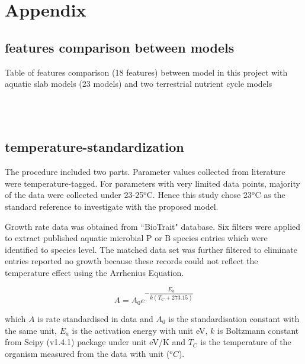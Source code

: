 \documentclass[../thesis.tex]{subfiles} %
\begin{document}
\section{Appendix}
\beginSupp

\subsection{features comparison between models}
\begin{table}[H]
\begin{tiny}
    \centering
    \caption[Model features comparison]{Table of features comparison (18 features) between model in this project with aquatic slab models (23 models) and two terrestrial nutrient cycle models}
    \\
    \vspace{.5cm}
    \\
    \vspace{.5cm}
    \label{modComp}
\end{tiny}
\end{table}

\subsection{temperature-standardization}
The procedure included two parts.  Parameter values collected from literature were temperature-tagged.  For parameters with very limited data points, majority of the data were collected under 23-25$^o$C.  Hence this study chose 23$^o$C as the standard reference to investigate with the proposed model.

Growth rate data was obtained from ``BioTrait" database\autocite{della2013thermal}.  Six filters were applied to extract published aquatic microbial P or B species entries which were identified to species level.  The matched data set was further filtered to eliminate entries reported no growth because these records could not reflect the temperature effect using the Arrhenius Equation.

\begin{equation}
    A = A_0e^{-\dfrac{E_a}{k(T_C+273.15)}}
    \label{arrEq}
\end{equation}

which $A$ is rate standardised in data and $A_0$ is the standardisation constant with the same unit, $E_a$ is the activation energy with unit eV, $k$ is Boltzmann constant from Scipy (v1.4.1) package under unit eV/K and $T_C$ is the temperature of the organism measured from the data with unit ($^oC$).
\end{document}
